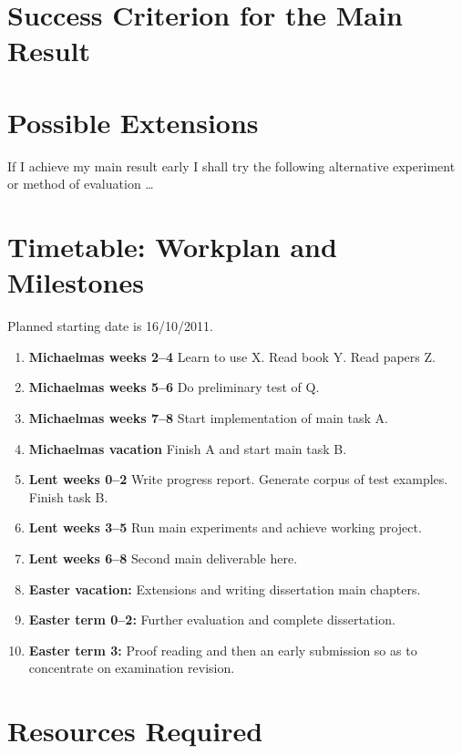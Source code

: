 \documentclass[12pt,a4paper,twoside]{article}
\begin{document}
\section*{Success Criterion for the Main Result}

\section*{Possible Extensions}

If I achieve my main result early I shall try the following
alternative experiment or method of evaluation \ldots


\section*{Timetable: Workplan and Milestones}

Planned starting date is 16/10/2011.

\begin{enumerate}

\item {\bf Michaelmas weeks 2--4} Learn to use X. Read book Y. Read papers Z.

\item {\bf Michaelmas weeks 5--6} Do preliminary test of Q.

\item {\bf Michaelmas weeks 7--8} Start implementation of main task A.

\item {\bf Michaelmas vacation} Finish A and start main task B.

\item {\bf Lent weeks 0--2} Write progress report. Generate corpus of
  test examples. Finish task B.

\item {\bf Lent weeks 3--5} Run main experiments and achieve working project.

\item {\bf Lent weeks 6--8} Second main deliverable here.

\item {\bf Easter vacation:} Extensions and writing dissertation main
  chapters.

\item {\bf Easter term 0--2:}  Further evaluation and complete dissertation.

\item {\bf Easter term 3:} Proof reading and then an early submission
  so as to concentrate on examination revision.

\end{enumerate}

\section*{Resources Required}
\end{document}
